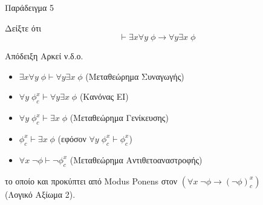 \documentclass{beamer}
\begin{document}
\begin{frame}{Παράδειγμα 5}
  \begin{block}{}
    Δείξτε ότι
    \[
      \vdash \exists x \forall y \; \phi \rightarrow \forall y \exists x \; \phi
    \]
  \end{block}
  \begin{block}{Απόδειξη}
    Αρκεί ν.δ.ο.
    \begin{itemize}
      \item $\exists x \forall y \; \phi \vdash \forall y \exists x \; \phi$ (Μεταθεώρημα Συναγωγής)
      \item $\forall y \; \phi_c^x \vdash \forall y \exists x \; \phi$ (Κανόνας EI)
      \item $\forall y \; \phi_c^x \vdash \exists x \; \phi$ (Μεταθεώρημα Γενίκευσης)
      \item $\phi_c^x \vdash \exists x \; \phi$ (εφόσον $\forall y \; \phi_c^x \vdash \phi_c^x$)
      \item $\forall x \; \neg\phi \vdash \neg\phi_c^x$ (Μεταθεώρημα Αντιθετοαναστροφής)
    \end{itemize}
    το οποίο και προκύπτει από Modus Ponens στον $(\forall x \; \neg\phi \rightarrow (\neg\phi)_c^x)$\\
    (Λογικό Αξίωμα 2).
  \end{block}
\end{frame}
\end{document}
